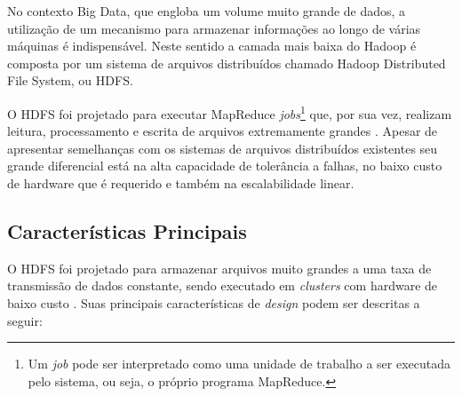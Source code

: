 No contexto Big Data, que engloba um volume muito grande de dados, a utilização de um mecanismo para armazenar informações ao longo de várias máquinas é indispensável. Neste sentido a camada mais baixa do Hadoop é composta por um sistema de arquivos distribuídos chamado Hadoop Distributed File System, ou HDFS.

O HDFS foi projetado para executar MapReduce \textit{jobs}\footnote{Um \textit{job} pode ser interpretado como uma unidade de trabalho a ser executada pelo sistema, ou seja, o próprio programa MapReduce.} que, por sua vez, realizam leitura, processamento e escrita de arquivos extremamente grandes \cite{venner2009}. Apesar de apresentar semelhanças com os sistemas de arquivos distribuídos existentes seu grande diferencial está na alta capacidade de tolerância a falhas, no baixo custo de hardware que é requerido e também na escalabilidade linear.

\subsection{Características Principais}

O HDFS foi projetado para armazenar arquivos muito grandes a uma taxa de transmissão de dados constante, sendo executado em \textit{clusters} com hardware de baixo custo \cite{white2012}. Suas principais características de \textit{design} podem ser descritas a seguir:

